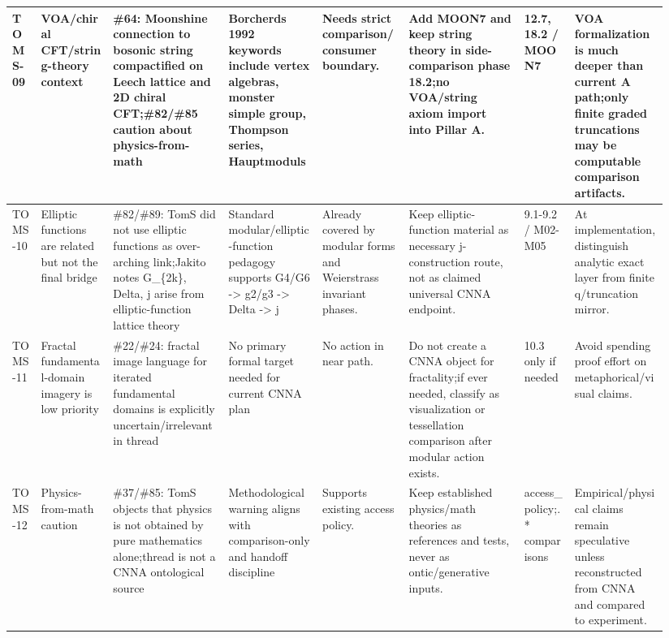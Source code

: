 \begin{longtable}{L{0.04\linewidth} L{0.105\linewidth} L{0.16\linewidth} L{0.13\linewidth} L{0.125\linewidth} L{0.165\linewidth} L{0.075\linewidth} L{0.135\linewidth}}
TOMS-09 & VOA/\allowbreak{}chiral CFT/\allowbreak{}string-theory context & \#64: Moonshine connection to bosonic string compactified on Leech lattice and 2D chiral CFT;\newline \#82/\allowbreak{}\#85 caution about physics-from-math & Borcherds 1992 keywords include vertex algebras, monster simple group, Thompson series, Hauptmoduls & Needs strict comparison/\allowbreak{}consumer boundary. & Add MOON7 and keep string theory in side-comparison phase 18.2;\newline no VOA/\allowbreak{}string axiom import into Pillar A. & 12.7, 18.2 /\allowbreak{} MOON7 & VOA formalization is much deeper than current A path;\newline only finite graded truncations may be computable comparison artifacts.\\
\hline
\addlinespace[0.24em]
TOMS-10 & Elliptic functions are related but not the final bridge & \#82/\allowbreak{}\#89: TomS did not use elliptic functions as over-arching link;\newline Jakito notes G\_\{2k\}, Delta, j arise from elliptic-function lattice theory & Standard modular/\allowbreak{}elliptic-function pedagogy supports G4/\allowbreak{}G6 -> g2/\allowbreak{}g3 -> Delta -> j & Already covered by modular forms and Weierstrass invariant phases. & Keep elliptic-function material as necessary j-construction route, not as claimed universal CNNA endpoint. & 9.1-9.2 /\allowbreak{} M02-M05 & At implementation, distinguish analytic exact layer from finite q/\allowbreak{}truncation mirror.\\
\hline
\addlinespace[0.24em]
TOMS-11 & Fractal fundamental-domain imagery is low priority & \#22/\allowbreak{}\#24: fractal image language for iterated fundamental domains is explicitly uncertain/\allowbreak{}irrelevant in thread & No primary formal target needed for current CNNA plan & No action in near path. & Do not create a CNNA object for fractality;\newline if ever needed, classify as visualization or tessellation comparison after modular action exists. & 10.3 only if needed & Avoid spending proof effort on metaphorical/\allowbreak{}visual claims.\\
\hline
\addlinespace[0.24em]
TOMS-12 & Physics-from-math caution & \#37/\allowbreak{}\#85: TomS objects that physics is not obtained by pure mathematics alone;\newline thread is not a CNNA ontological source & Methodological warning aligns with comparison-only and handoff discipline & Supports existing access policy. & Keep established physics/\allowbreak{}math theories as references and tests, never as ontic/\allowbreak{}generative inputs. & access\_policy;.* comparisons & Empirical/\allowbreak{}physical claims remain speculative unless reconstructed from CNNA and compared to experiment.\\

\end{longtable}
